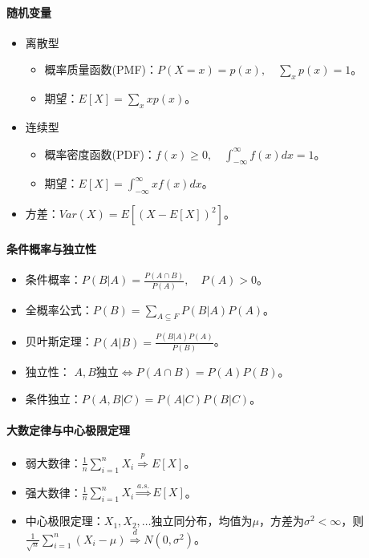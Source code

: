 \documentclass[
12pt, %
a4paper, 
oneside, %
]{scrartcl}
\begin{document}
{\paragraph{随机变量}
\begin{itemize}
\item 离散型
\begin{itemize}
\item 概率质量函数(PMF)：$ P(X = x) = p(x), \quad \sum_{x} p(x) = 1 $。
\item 期望：$ E[X] = \sum_{x} x p(x) $。
\end{itemize}
\item 连续型
\begin{itemize}
\item 概率密度函数(PDF)：$ f(x) \geq 0, \quad \int_{-\infty}^{\infty} f(x) dx = 1 $。
\item 期望：$ E[X] = \int_{-\infty}^{\infty} x f(x) dx $。
\end{itemize}
\item 方差：$ Var(X) = E[(X - E[X])^2] $。
\end{itemize}
\paragraph{条件概率与独立性}
\begin{itemize}
\item 条件概率：$ P(B|A) = \frac{P(A \cap B)}{P(A)}, \quad P(A) > 0 $。
\item 全概率公式：$ P(B) = \sum_{A \subseteq F} P(B|A) P(A) $。
\item 贝叶斯定理：$ P(A|B) = \frac{P(B|A) P(A)}{P(B)} $。
\item 独立性： $ A, B $独立$ \Leftrightarrow $$ P(A \cap B) = P(A)P(B) $。
\item 条件独立：$ P(A, B|C) = P(A|C)P(B|C) $。
\end{itemize}
\paragraph{大数定律与中心极限定理}
\begin{itemize}
\item 弱大数律：$ \frac{1}{n} \sum_{i = 1}^n X_i \overset{p}{\Longrightarrow} E[X] $。
\item 强大数律：$ \frac{1}{n} \sum_{i = 1}^n X_i \overset{a.s.}{\Longrightarrow} E[X] $。
\item 中心极限定理：$ X_1, X_2, \dots $独立同分布，均值为$ \mu $，方差为$ \sigma^2 < \infty $，则$ \frac{1}{\sqrt{n}} \sum_{i = 1}^n (X_i - \mu) \overset{d}{\Longrightarrow} N(0, \sigma^2) $。
\end{itemize}
}
\end{document}
